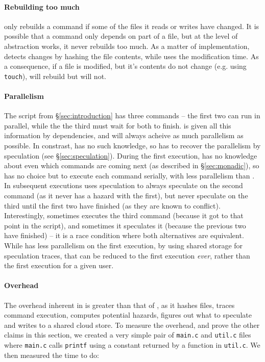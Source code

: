 \paragraph{Rebuilding too much} \Rattle only rebuilds a command if some of the files it reads or writes have changed. It is possible that a command only depends on part of a file, but at the level of abstraction \Rattle works, it never rebuilds too much. As a matter of implementation, \Rattle detects changes by hashing the file contents, while \Make uses the modification time. As a consequence, if a file is modified, but it's contents do not change (e.g. using \texttt{touch}), \Make will rebuild but \Rattle will not.

\paragraph{Parallelism} The script from \S\ref{sec:introduction} has three commands -- the first two can run in parallel, while the the third must wait for both to finish. \Make is given all this information by dependencies, and will always acheive as much parallelism as possible. In constrast, \Rattle has no such knowledge, so has to recover the parallelism by speculation (see \S\ref{sec:speculation}). During the first execution, \Rattle has no knowledge about even which commands are coming next (as described in \S\ref{sec:monadic}), so has no choice but to execute each command serially, with less parallelism than \Make. In subsequent executions \Rattle uses speculation to always speculate on the second command (as it never has a hazard with the first), but never speculate on the third until the first two have finished (as they are known to conflict). Interestingly, sometimes \Rattle executes the third command (because it got to that point in the script), and sometimes it speculates it (because the previous two have finished) -- it is a race condition where both alternatives are equivalent. While \Rattle has less parallelism on the first execution, by using shared storage for speculation traces, that can be reduced to the first execution \emph{ever}, rather than the first execution for a given user.

\paragraph{Overhead} The overhead inherent in \Rattle is greater than that of \Make, as it hashes files, traces command execution, computes potential hazards, figures out what to speculate and writes to a shared cloud store. To measure the overhead, and prove the other claims in this section, we created a very simple pair of \texttt{main.c} and \texttt{util.c} files where \texttt{main.c} calls \texttt{printf} using a constant returned by a function in \texttt{util.c}. We then measured the time to do:

